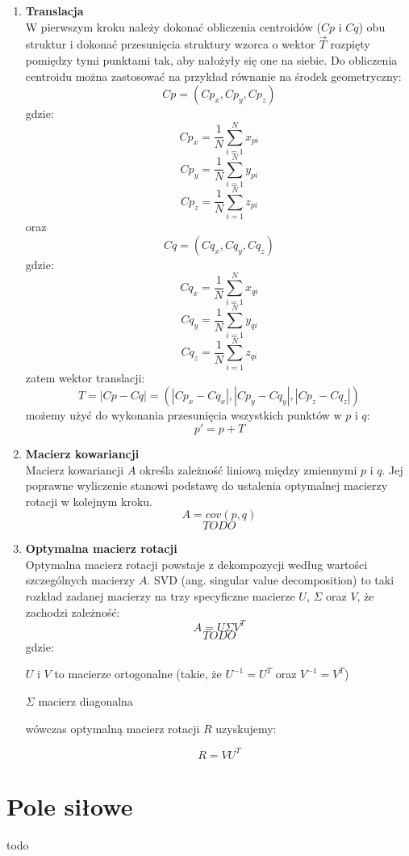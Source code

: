 \documentclass[licencjacka]{pracamgr}
\begin{document}
\begin{enumerate}
\item \textbf{Translacja} \\
W pierwszym kroku należy dokonać obliczenia centroidów ($Cp$ i $Cq$) obu struktur i dokonać przesunięcia struktury wzorca o wektor $\vec{T}$ rozpięty pomiędzy tymi punktami tak, aby nałożyły się one na siebie. Do obliczenia centroidu można zastosować na przykład równanie na środek geometryczny: 
$$Cp = (Cp_x, Cp_y, Cp_z)$$
gdzie:
$$Cp_x = \frac{1}{N}\sum_{i=1}^{N}{x_{pi}}$$
$$Cp_y = \frac{1}{N}\sum_{i=1}^{N}{y_{pi}}$$
$$Cp_z = \frac{1}{N}\sum_{i=1}^{N}{z_{pi}}$$
oraz
$$Cq = (Cq_x, Cq_y, Cq_z)$$
gdzie:
$$Cq_x = \frac{1}{N}\sum_{i=1}^{N}{x_{qi}}$$
$$Cq_y = \frac{1}{N}\sum_{i=1}^{N}{y_{qi}}$$
$$Cq_z = \frac{1}{N}\sum_{i=1}^{N}{z_{qi}}$$
zatem wektor translacji:
$$ T = |Cp-Cq| =(|Cp_x-Cq_x|,|Cp_y-Cq_y|,|Cp_z-Cq_z|)$$
możemy użyć do wykonania przesunięcia wszystkich punktów w $p$ i $q$:
$$p'=p+T$$
\item \textbf{Macierz kowariancji} \\
Macierz kowariancji $A$ określa zależność liniową między zmiennymi $p$ i $q$. Jej poprawne wyliczenie stanowi podstawę do ustalenia optymalnej macierzy rotacji w kolejnym kroku.
$$ 
A=cov(p,q)
$$
$$
 TODO
$$

\item \textbf{Optymalna macierz rotacji} \\
Optymalna macierz rotacji powstaje z dekompozycji według wartości szczególnych macierzy $A$. SVD (ang. singular value decomposition) to taki rozkład zadanej macierzy na trzy specyficzne macierze $U$, $\Sigma$ oraz $V$, że zachodzi zależność:
$$
A=U \Sigma V^T
$$
$$
 TODO
$$
gdzie:

\quad$U$ i $V$ to macierze ortogonalne (takie, że $U^{-1}=U^{T}$ oraz $V^{-1}=V^{T}$)

\quad$\Sigma$ macierz diagonalna

wówczas optymalną macierz rotacji $R$ uzyskujemy:

$$R=VU^T$$

\end{enumerate}


\section{Pole siłowe}
todo
	
\end{document}
